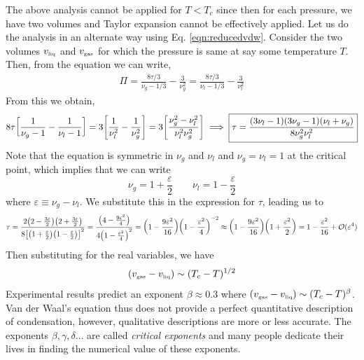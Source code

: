 The above analysis cannot be applied for $T<T_c$ since then for each pressure, we have two volumes and Taylor expansion cannot be effectively applied. Let us do the analysis in an alternate way using Eq. \eqref{eqn:reducedvdw}. Consider the two volumes $v_{\text{\tiny liq}}$ and $v_{\text{\tiny gas}}$ for which the pressure is same at say some temperature $T$. Then, from the equation we can write,
\begin{align*}
    \Pi = \frac{8\tau/3}{\nu_g-1/3} -\frac{3}{\nu_g^2} = \frac{8\tau/3}{\nu_l-1/3} -\frac{3}{\nu_l^2} 
\end{align*}
From this we obtain,
$$8\tau\qty[\frac{1}{\nu_g-1} -\frac{1}{\nu_l-1}] = 3\qty[\frac{1}{\nu_l^2}-\frac{1}{\nu_g^2}] =3\qty[\frac{\nu_g^2-\nu_l^2}{\nu_l^2\nu_g^2}] \implies \boxed{\tau = \frac{(3\nu_l-1)(3\nu_g-1)(\nu_l+\nu_g)}{8\nu_g^2\nu_l^2}}$$
Note that the equation is symmetric in $\nu_g$ and $\nu_l$ and $\nu_g=\nu_l=1$ at the critical point, which implies that we can write $$\nu_g = 1+\frac{\varepsilon}{2}\qquad \nu_l = 1-\frac{\varepsilon}{2}$$
where $\varepsilon \equiv \nu_g-\nu_l$. We substitute this in the expression for $\tau$, leading us to 
\begin{align*}
    \tau = \frac{2\qty(2-\frac{3\varepsilon}{2})\qty(2+\frac{3\varepsilon}{2})}{8\qty[\qty(1+\frac{\varepsilon}{2})\qty(1-\frac{\varepsilon}{2})]^2} =\frac{\qty(4-\frac{9\varepsilon^2}{4})}{4\qty(1-\frac{\varepsilon^2}{4})^2} = \qty( 1-\frac{9\varepsilon^2}{16})\qty(1-\frac{\varepsilon^2}{4})^{-2} \approx 
    \qty( 1-\frac{9\varepsilon^2}{16})\qty(1+\frac{\varepsilon^2}{2}) = 1-\frac{\varepsilon^2}{16}+\mathcal O(\varepsilon^4)
\end{align*}
Then substituting for the real variables, we have $$(v_{\text{\tiny gas}}-v_{\text{\tiny liq}}) \sim (T_c-T)^{1/2}$$
Experimental results predict an exponent $\beta\approx 0.3$ where $(v_{\text{\tiny gas}}-v_{\text{\tiny liq}}) \sim (T_c-T)^\beta$.\\[0.2cm]
Van der Waal's equation thus does not provide a perfect quantitative description of condensation, however, qualitative descriptions are more or less accurate. The exponents $\beta,\gamma,\delta\ldots$ are called \textit{critical exponents} and many people dedicate their lives in finding the numerical value of these exponents.